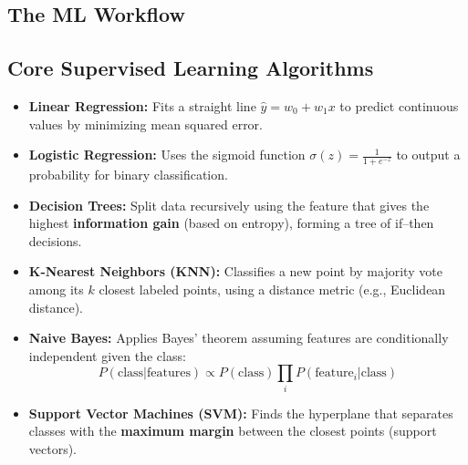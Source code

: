 \documentclass[11pt,a4paper]{article}
\begin{document}
\subsection{The ML Workflow}
\begin{center}
\end{center}

\subsection{Core Supervised Learning Algorithms}
\begin{itemize}[leftmargin=*]
  \item \textbf{Linear Regression:} Fits a straight line $\hat{y}=w_0+w_1x$ to predict continuous values by minimizing mean squared error.
  \item \textbf{Logistic Regression:} Uses the sigmoid function $\sigma(z)=\frac{1}{1+e^{-z}}$ to output a probability for binary classification.
  \item \textbf{Decision Trees:} Split data recursively using the feature that gives the highest \textbf{information gain} (based on entropy), forming a tree of if--then decisions.
  \item \textbf{K-Nearest Neighbors (KNN):} Classifies a new point by majority vote among its $k$ closest labeled points, using a distance metric (e.g., Euclidean distance).
  \item \textbf{Naive Bayes:} Applies Bayes' theorem assuming features are conditionally independent given the class:
  $$
  P(\text{class}|\text{features}) \propto P(\text{class})\prod_i P(\text{feature}_i|\text{class})
  $$
  \item \textbf{Support Vector Machines (SVM):} Finds the hyperplane that separates classes with the \textbf{maximum margin} between the closest points (support vectors).
\end{itemize}
\end{document}
